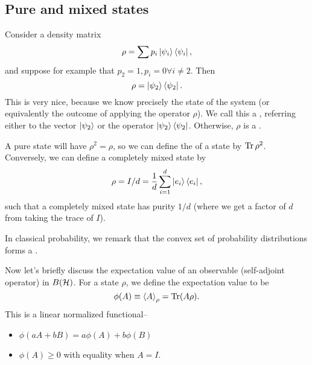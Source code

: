 \subsection*{Pure and mixed states} 
Consider a density matrix
\begin{equation}
    \rho = \sum p_i \left| \psi_i \right>\left< \psi_i \right|,
\end{equation}
and suppose for example that $p_2=1, p_i=0 \forall i\neq 2$. Then
\begin{equation}
    \rho=\left| \psi_2 \right>\left< \psi_2 \right|.
\end{equation}
This is very nice, because we know precisely the state of the system (or equivalently the outcome of applying the operator $\rho$). We call this a , referring either to the vector $\left| \psi_2 \right>$ or the operator $\left| \psi_2 \right>\left< \psi_2 \right|$. Otherwise, $\rho$ is a .

A pure state will have $\rho^2 = \rho$, so we can define the  of a state by $\operatorname{Tr} \rho^2$. Conversely, we can define a completely mixed state by
\begin{equation}
    \rho = I/d=\frac{1}{d} \sum_{i=1}^d \left| e_i \right> \left< e_i \right|,
\end{equation}
such that a completely mixed state has purity $1/d$ (where we get a factor of $d$ from taking the trace of $I$).

In classical probability, we remark that the convex set of probability distributions forms a .

Now let's briefly discuss the expectation value of an observable (self-adjoint operator) in $B(\mathcal H)$. For a state $\rho$, we define the expectation value to be
\begin{equation}
    \phi(A) \equiv \left< A \right>_\rho =\operatorname{Tr}(A \rho).
\end{equation}
This is a linear normalized functional--
\begin{itemize}
    \item $\phi(aA +b B) = a\phi(A) + b\phi(B)$
    \item $\phi(A)\geq 0$ with equality when $A=I$.
\end{itemize}